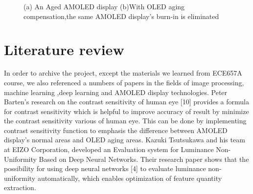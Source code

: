 \documentclass[runningheads]{llncs}
\begin{document}
\begin{figure}
    \centering
    \caption{ (a) An Aged AMOLED display (b)With OLED aging compensation,the same AMOLED display's burn-in is eliminated }
    \label{fig:1}
\end{figure}

\section{Literature review}
In order to archive the project, except the materials we learned from ECE657A course, we also referenced a numbers of papers in the fields of image processing, machine learning ,deep learning and AMOLED display technologies.
Peter Barten’s research on the contrast sensitivity of human eye [10] provides a formula for contrast sensitivity which is helpful to improve accuracy of result by minimize the contrast sensitivity various of human eye. This can be done by implementing contrast sensitivity function to emphasis the difference between AMOLED display's normal areas and OLED aging areas.
Kazuki Tsutsukawa and his team at EIZO Corporation, developed an Evaluation system for Luminance Non-Uniformity Based on Deep Neural Networks. Their research paper shows that the possibility for using deep neural networks [4] to evaluate luminance non-uniformity automatically, which enables optimization of feature quantity extraction.
\end{document}

